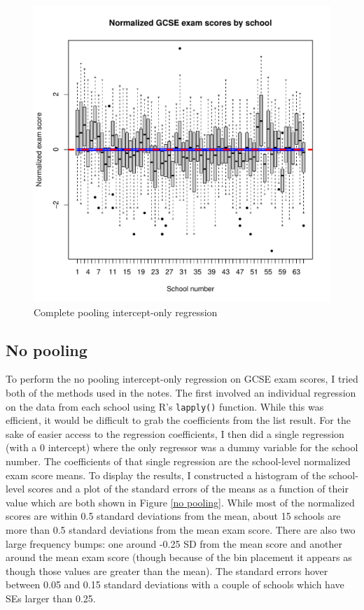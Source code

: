 \documentclass{article}
\begin{document}
\begin{figure}[H]
\centering
\includegraphics[width = 6in]{figures/complete_pooling.pdf}
\caption{Complete pooling intercept-only regression}
\label{complete pool}
\end{figure}

\subsection{No pooling}
To perform the no pooling intercept-only regression on GCSE exam scores, I tried both of the methods used in the notes. The first involved an individual regression on the data from each school using R's \verb|lapply()| function. While this was efficient, it would be difficult to grab the coefficients from the list result. For the sake of easier access to the regression coefficients, I then did a single regression (with a 0 intercept) where the only regressor was a dummy variable for the school number. The coefficients of that single regression are the school-level normalized exam score means. To display the results, I constructed a histogram of the school-level scores and a plot of the standard errors of the means as a function of their value which are both shown in Figure \ref{no pooling}. While most of the normalized scores are within 0.5 standard deviations from the mean, about 15 schools are more than 0.5 standard deviations from the mean exam score. There are also two large frequency bumps: one around -0.25 SD from the mean score and another around the mean exam score (though because of the bin placement it appears as though those values are greater than the mean). The standard errors hover between 0.05 and 0.15 standard deviations with a couple of schools which have SEs larger than 0.25.
\end{document}
